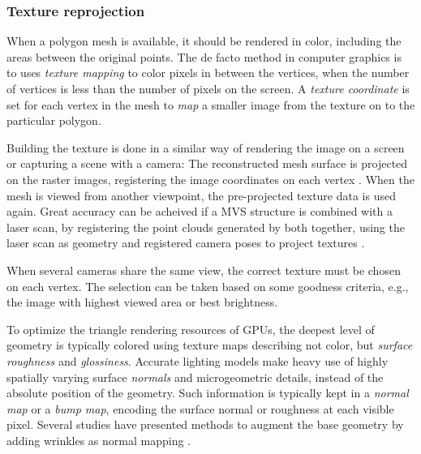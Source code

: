 

\subsubsection{Texture reprojection} %

When a polygon mesh is available, it should be rendered in color, including the areas between the original points.
The de facto method in computer graphics is to uses \emph{texture mapping} to color pixels in between the vertices, when the number of vertices is less than the number of pixels on the screen.
A \emph{texture coordinate} is set for each vertex in the mesh to \emph{map} a smaller image from the texture on to the particular polygon. \cite{heckbert1986survey}

Building the texture is done in a similar way of rendering the image on a screen or capturing a scene with a camera:
The reconstructed mesh surface is projected on the raster images, registering the image coordinates on each vertex \cite[p. 610]{szeliski10vision} \cite[p. 98]{heyden2005multiple}.
When the mesh is viewed from another viewpoint, the pre-projected texture data is used again.
Great accuracy can be acheived if a MVS structure is combined with a laser scan, by registering the point clouds generated by both together, using the laser scan as geometry and registered camera poses to project textures \cite{liu2006multiview}.

When several cameras share the same view, the correct texture must be chosen on each vertex.
The selection can be taken based on some goodness criteria, e.g., the image with highest viewed area or best brightness.


To optimize the triangle rendering resources of GPUs, the deepest level of geometry is typically colored using texture maps describing not color, but \emph{surface roughness} and \emph{glossiness}.
Accurate lighting models make heavy use of highly spatially varying surface \emph{normals} and microgeometric details, instead of the absolute position of the geometry.
Such information is typically kept in a \emph{normal map} or a \emph{bump map}, encoding the surface normal or roughness at each visible pixel.
Several studies have presented methods to augment the base geometry by adding wrinkles as normal mapping \cite{bickel2007multi}.

